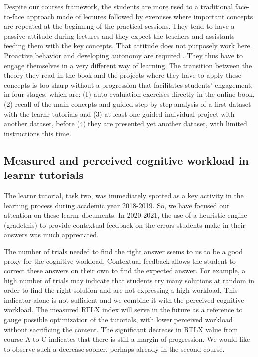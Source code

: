 \documentclass{aims}
\theoremstyle{definition}
\begin{document}
Despite our courses framework, the students are more used to a
traditional face-to-face approach made of lectures followed by exercises
where important concepts are repeated at the beginning of the practical
sessions. They tend to have a passive attitude during lectures and they
expect the teachers and assistants feeding them with the key concepts.
That attitude does not purposely work here. Proactive behavior and
developing autonomy are required \cite{Freeman2014}. They thus have to
engage themselves in a very different way of learning. The transition
between the theory they read in the book and the projects where they
have to apply these concepts is too sharp without a progression that
facilitates students' engagement, in four stages, which are: (1)
auto-evaluation exercises directly in the online book, (2) recall of the
main concepts and guided step-by-step analysis of a first dataset with
the learnr tutorials and (3) at least one guided individual project with
another dataset, before (4) they are presented yet another dataset, with
limited instructions this time.

\hypertarget{measured-and-perceived-cognitive-workload-in-learnr-tutorials-2}{%
\subsection{Measured and perceived cognitive workload in learnr
tutorials}\label{measured-and-perceived-cognitive-workload-in-learnr-tutorials-2}}

The learnr tutorial, task two, was immediately spotted as a key activity
in the learning process during academic year 2018-2019. So, we have
focused our attention on these learnr documents. In 2020-2021, the use
of a heuristic engine (gradethis) to provide contextual feedback on the
errors students make in their answers was much appreciated.

The number of trials needed to find the right answer seems to us to be a
good proxy for the cognitive workload. Contextual feedback allows the
student to correct these answers on their own to find the expected
answer. For example, a high number of trials may indicate that students
try many solutions at random in order to find the right solution and are
not expressing a high workload. This indicator alone is not sufficient
and we combine it with the perceived cognitive workload. The measured
RTLX index will serve in the future as a reference to gauge possible
optimization of the tutorials, with lower perceived workload without
sacrificing the content. The significant decrease in RTLX value from
course A to C indicates that there is still a margin of progression. We
would like to observe such a decrease sooner, perhaps already in the
second course.
\end{document}
